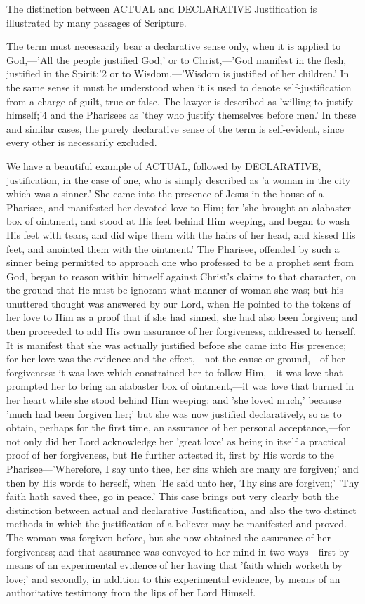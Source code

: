 \documentclass[
]{book}
\begin{document}
The distinction between ACTUAL and DECLARATIVE Justification is illustrated by many passages of Scripture.

The term must necessarily bear a declarative sense only, when it is applied to God,---'All the people justified God;' or to Christ,---'God manifest in the flesh, justified in the Spirit;'2 or to Wisdom,---'Wisdom is justified of her children.' In the same sense it must be understood when it is used to denote self-justification from a charge of guilt, true or false. The lawyer is described as 'willing to justify himself;'4 and the Pharisees as 'they who justify themselves before men.' In these and similar cases, the purely declarative sense of the term is self-evident, since every other is necessarily excluded.

We have a beautiful example of ACTUAL, followed by DECLARATIVE, justification, in the case of one, who is simply described as 'a woman in the city which was a sinner.' She came into the presence of Jesus in the house of a Pharisee, and manifested her devoted love to Him; for 'she brought an alabaster box of ointment, and stood at His feet behind Him weeping, and began to wash His feet with tears, and did wipe them with the hairs of her head, and kissed His feet, and anointed them with the ointment.' The Pharisee, offended by such a sinner being permitted to approach one who professed to be a prophet sent from God, began to reason within himself against Christ's claims to that character, on the ground that He must be ignorant what manner of woman she was; but his unuttered thought was answered by our Lord, when He pointed to the tokens of her love to Him as a proof that if she had sinned, she had also been forgiven; and then proceeded to add His own assurance of her forgiveness, addressed to herself. It is manifest that she was actually justified before she came into His presence; for her love was the evidence and the effect,---not the cause or ground,---of her forgiveness: it was love which constrained her to follow Him,---it was love that prompted her to bring an alabaster box of ointment,---it was love that burned in her heart while she stood behind Him weeping: and 'she loved much,' because 'much had been forgiven her;' but she was now justified declaratively, so as to obtain, perhaps for the first time, an assurance of her personal acceptance,---for not only did her Lord acknowledge her 'great love' as being in itself a practical proof of her forgiveness, but He further attested it, first by His words to the Pharisee---'Wherefore, I say unto thee, her sins which are many are forgiven;' and then by His words to herself, when 'He said unto her, Thy sins are forgiven;' 'Thy faith hath saved thee, go in peace.' This case brings out very clearly both the distinction between actual and declarative Justification, and also the two distinct methods in which the justification of a believer may be manifested and proved. The woman was forgiven before, but she now obtained the assurance of her forgiveness; and that assurance was conveyed to her mind in two ways---first by means of an experimental evidence of her having that 'faith which worketh by love;' and secondly, in addition to this experimental evidence, by means of an authoritative testimony from the lips of her Lord Himself.
\end{document}
